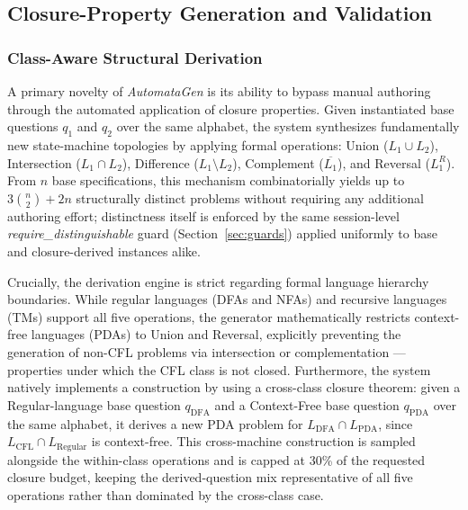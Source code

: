 \documentclass[sigconf]{acmart}
\begin{document}
\subsection{Closure-Property Generation and Validation}
\label{sec:closure}

\subsubsection{Class-Aware Structural Derivation}
A primary novelty of \textit{AutomataGen} is its ability to bypass manual authoring through the automated application of closure properties. Given instantiated base questions $q_1$ and $q_2$ over the same alphabet, the system synthesizes fundamentally new state-machine topologies by applying formal operations: Union ($L_1 \cup L_2$), Intersection ($L_1 \cap L_2$), Difference ($L_1 \setminus L_2$), Complement ($\overline{L_1}$), and Reversal ($L_1^R$). From $n$ base specifications, this mechanism combinatorially yields up to $3\binom{n}{2} + 2n$ structurally distinct problems without requiring any additional authoring effort; distinctness itself is enforced by the same session-level \textit{require\_distinguishable} guard (Section~\ref{sec:guards}) applied uniformly to base and closure-derived instances alike.

Crucially, the derivation engine is strict regarding formal language hierarchy boundaries. While regular languages (DFAs and NFAs) and recursive languages (TMs) support all five operations, the generator mathematically restricts context-free languages (PDAs) to Union and Reversal, explicitly preventing the generation of non-CFL problems via intersection or complementation --- properties under which the CFL class is not closed. Furthermore, the system natively implements a construction by using a cross-class closure theorem: given a Regular-language base question $q_{\text{DFA}}$ and a Context-Free base question $q_{\text{PDA}}$ over the same alphabet, it derives a new PDA problem for $L_{\text{DFA}} \cap L_{\text{PDA}}$, since $L_{\text{CFL}} \cap L_{\text{Regular}}$ is context-free. This cross-machine construction is sampled alongside the within-class operations and is capped at 30\% of the requested closure budget, keeping the derived-question mix representative of all five operations rather than dominated by the cross-class case.
\end{document}
